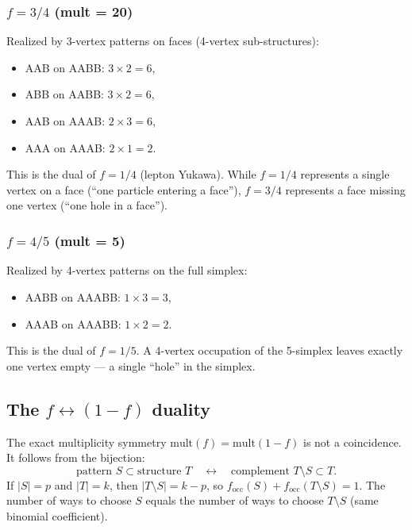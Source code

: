 \subsubsection{$f = 3/4$ (mult = 20)}

Realized by 3-vertex patterns on faces (4-vertex sub-structures):
\begin{itemize}
\item AAB on AABB: $3 \times 2 = 6$,
\item ABB on AABB: $3 \times 2 = 6$,
\item AAB on AAAB: $2 \times 3 = 6$,
\item AAA on AAAB: $2 \times 1 = 2$.
\end{itemize}
This is the dual of $f = 1/4$ (lepton Yukawa).  While $f = 1/4$ represents a single vertex on a face (``one particle entering a face''), $f = 3/4$ represents a face missing one vertex (``one hole in a face'').

\subsubsection{$f = 4/5$ (mult = 5)}

Realized by 4-vertex patterns on the full simplex:
\begin{itemize}
\item AABB on AAABB: $1 \times 3 = 3$,
\item AAAB on AAABB: $1 \times 2 = 2$.
\end{itemize}
This is the dual of $f = 1/5$.  A 4-vertex occupation of the 5-simplex leaves exactly one vertex empty --- a single ``hole'' in the simplex.

\subsection{The $f \leftrightarrow (1-f)$ duality}
\label{sec:f_duality}

The exact multiplicity symmetry $\mathrm{mult}(f) = \mathrm{mult}(1-f)$ is not a coincidence.  It follows from the bijection:
\begin{equation}
\text{pattern } S \subset \text{structure } T \quad \longleftrightarrow \quad \text{complement } T \setminus S \subset T.
\end{equation}
If $|S| = p$ and $|T| = k$, then $|T \setminus S| = k - p$, so $f_\mathrm{occ}(S) + f_\mathrm{occ}(T \setminus S) = 1$.  The number of ways to choose $S$ equals the number of ways to choose $T \setminus S$ (same binomial coefficient).

